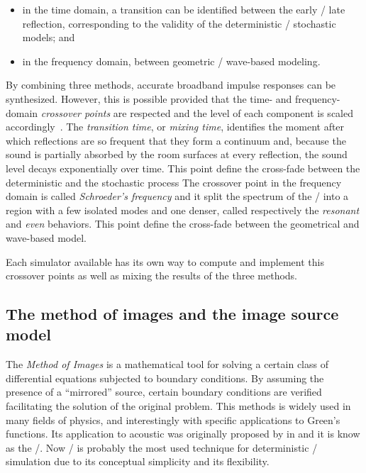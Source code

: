 \begin{itemize}
    \item in the time domain, a transition can be identified between the early \vs/ late reflection, corresponding to the validity of the deterministic \vs/ stochastic models; and
    \item in the frequency domain, between geometric \vs/ wave-based modeling.
\end{itemize}
By combining three methods, accurate broadband impulse responses can be synthesized.
However, this is possible provided that the time- and frequency-domain
\textit{crossover points} are respected and the level of each component is scaled accordingly~.
The \textit{transition time}, or \textit{mixing time}, identifies the moment after which reflections are so frequent that they form a continuum and,
because the sound is partially absorbed by the room surfaces at every reflection,
the sound level decays exponentially over time.
This point define the cross-fade between the deterministic and the stochastic process
The crossover point in the frequency domain is called \textit{Schroeder's frequency}
and it split the spectrum of the \RIR/ into a region with a few isolated modes and one denser,
called respectively the \textit{resonant} and \textit{even} behaviors.
This point define the cross-fade between the geometrical and wave-based model.

Each simulator available has its own way to compute and implement this crossover points as well as mixing the results of the three methods.

\subsection{The method of images and the image source model}\label{subsec:acoustics:ism}
The \textit{Method of Images} is a mathematical tool for solving a certain class of differential equations subjected to boundary conditions.
By assuming the presence of a ``mirrored'' source, certain boundary conditions are verified facilitating the solution of the original problem.
This methods is widely used in many fields of physics, and interestingly with specific applications to Green's functions.
Its application to acoustic was originally proposed by \citeauthor{allen1979image} in  and it is know as the \ISMdef/.
Now \ISM/ is probably the most used technique for deterministic \RIR/ simulation due to its conceptual simplicity and its flexibility.

